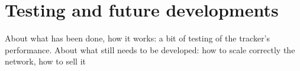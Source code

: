 \chapter{Testing and future developments}
\label{cha:future}

About what has been done, how it works: a bit of testing of the tracker's performance. About what still needs to be developed: how to scale correctly the network, how to sell it

